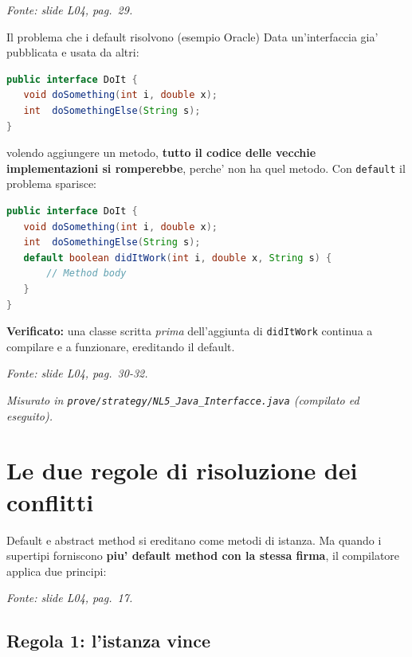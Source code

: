 \documentclass{report}
\newcommand{\code}[1]{\texttt{\small #1}}
\newcommand{\fonteslide}[1]{{\footnotesize\itshape\color{gray} Fonte: slide \emph{L04}, pag.~#1.\par}}
\newcommand{\fonteprove}[1]{{\footnotesize\itshape\color{gray} Misurato in \code{prove/strategy/#1} (compilato ed eseguito).\par}}
\begin{document}
\fonteslide{29}

\begin{Example}{Il problema che i default risolvono (esempio Oracle)}{}
Data un'interfaccia gia' pubblicata e usata da altri:
\begin{lstlisting}[language=Java]
public interface DoIt {
   void doSomething(int i, double x);
   int  doSomethingElse(String s);
}
\end{lstlisting}
volendo aggiungere un metodo, \textbf{tutto il codice delle vecchie
implementazioni si romperebbe}, perche' non ha quel metodo. Con
\code{default} il problema sparisce:
\begin{lstlisting}[language=Java]
public interface DoIt {
   void doSomething(int i, double x);
   int  doSomethingElse(String s);
   default boolean didItWork(int i, double x, String s) {
       // Method body
   }
}
\end{lstlisting}
\textbf{Verificato:} una classe scritta \emph{prima} dell'aggiunta di
\code{didItWork} continua a compilare e a funzionare, ereditando il
default.
\end{Example}

\fonteslide{30-32}
\fonteprove{NL5\_Java\_Interfacce.java}

\section{Le due regole di risoluzione dei conflitti}\label{sec:regole}

Default e abstract method si ereditano come metodi di istanza. Ma quando
i supertipi forniscono \textbf{piu' default method con la stessa firma},
il compilatore applica due principi:


\fonteslide{17}

\subsection{Regola 1: l'istanza vince}
\end{document}

